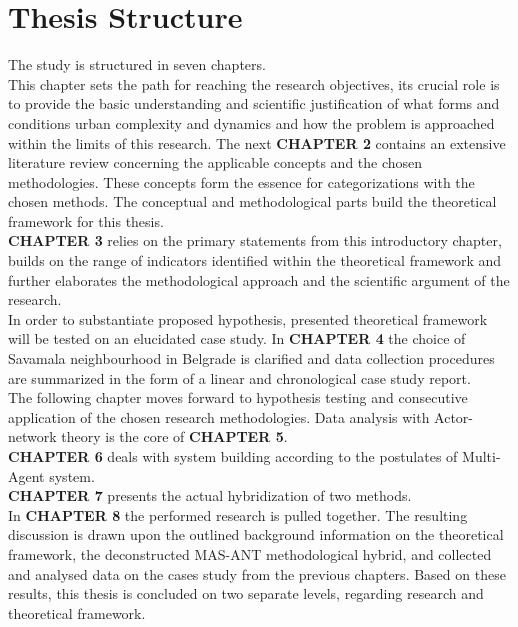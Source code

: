 \documentclass[11pt]{report}
\begin{document}
\section{Thesis Structure}

The study is structured in seven chapters.
\\
This chapter sets the path for reaching the research objectives, its crucial role is to provide the basic understanding and scientific justification of what forms and conditions urban complexity and dynamics and how the problem is approached within the limits of this research. The next \textbf{CHAPTER 2} contains an extensive literature review concerning the applicable concepts and the chosen methodologies. These concepts form the essence for categorizations with the chosen methods.
The conceptual and methodological parts build the theoretical framework for this thesis. 
\\
\textbf{CHAPTER 3} relies on the primary statements from this introductory chapter, builds on the range of indicators identified within the theoretical framework and further elaborates the methodological approach and the scientific argument of the research.
\\
In order to substantiate proposed hypothesis,  presented  theoretical framework will be tested on an elucidated case study. In \textbf{CHAPTER 4} the choice of Savamala neighbourhood in Belgrade is clarified and data collection procedures are summarized in the form of a linear and chronological case study report.
\\
The following chapter moves forward to hypothesis testing and consecutive application of the chosen research methodologies. Data analysis with Actor-network theory is the core of \textbf{CHAPTER 5}.
\\
\textbf{CHAPTER 6} deals with system building according to the postulates of Multi-Agent system.
\\
\textbf{CHAPTER 7} presents the actual hybridization of two methods.
\\
In \textbf{CHAPTER 8} the performed research is pulled together. The resulting discussion is drawn upon the outlined background information on the theoretical framework, the deconstructed MAS-ANT methodological hybrid, and collected and analysed data on the cases study from the previous chapters. Based on these results, this thesis is concluded on two separate levels, regarding research and theoretical framework.


\end{document}
